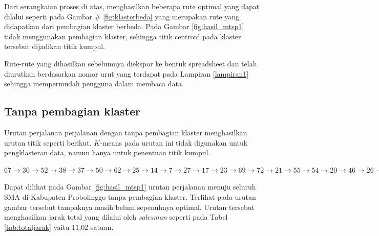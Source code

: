 Dari serangkaian proses di atas, menghasilkan beberapa rute optimal yang dapat dilalui seperti pada Gambar \# \ref{fig:klasterbeda} yang merupakan rute yang didapatkan dari pembagian klaster berbeda. Pada Gambar \ref{fig:hasil_mtsp1} tidak menggunakan pembagian klaster, sehingga titik centroid pada klaster tersebut dijadikan titik kumpul.

Rute-rute yang dihasilkan sebelumnya diekspor ke bentuk spreadsheet dan telah diurutkan berdasarkan nomor urut yang terdapat pada Lampiran \ref{lampiran1} sehingga mempermudah pengguna dalam membaca data.

\subsection{Tanpa pembagian klaster}

Urutan perjalanan perjalanan dengan tanpa pembagian klaster menghasilkan urutan titik seperti berikut. $K$-means pada urutan ini tidak digunakan untuk pengklasteran data, namun hanya untuk penentuan titik kumpul.

\noindent $
67 \rightarrow 30 \rightarrow 52 \rightarrow 38 \rightarrow 37 \rightarrow 50 \rightarrow 62 \rightarrow 25 \rightarrow 14 \rightarrow 7 \rightarrow 27 \rightarrow 17 \rightarrow 23 \rightarrow 69 \rightarrow 72 \rightarrow 21 \rightarrow 55 \rightarrow 54 \rightarrow 20 \rightarrow 46 \rightarrow 26 \rightarrow 59 \rightarrow 60 \rightarrow 16 \rightarrow 58 \rightarrow 45 \rightarrow 15 \rightarrow 65 \rightarrow 36 \rightarrow 18 \rightarrow 40 \rightarrow 70 \rightarrow 75 \rightarrow 2 \rightarrow 44 \rightarrow 11 \rightarrow 41 \rightarrow 53 \rightarrow 3 \rightarrow 71 \rightarrow 10 \rightarrow 6 \rightarrow 29 \rightarrow 74 \rightarrow 68 \rightarrow 47 \rightarrow 32 \rightarrow 56 \rightarrow 63 \rightarrow 9 \rightarrow 51 \rightarrow 49 \rightarrow 35 \rightarrow 1 \rightarrow 73 \rightarrow 24 \rightarrow 33 \rightarrow 57 \rightarrow 61 \rightarrow 22 \rightarrow 34 \rightarrow 8 \rightarrow 43 \rightarrow 66 \rightarrow 42 \rightarrow 13 \rightarrow 5 \rightarrow 4 \rightarrow 64 \rightarrow 31 \rightarrow 39 \rightarrow 19 \rightarrow 28 \rightarrow 48 \rightarrow 12$

Dapat dilihat pada Gambar \ref{fig:hasil_mtsp1} urutan perjalanan menuju seluruh SMA di Kabupaten Probolinggo tanpa pembagian klaster. Terlihat pada urutan gambar tersebut tampaknya masih belum sepenuhnya optimal. Urutan tersebut menghasilkan jarak total yang dilalui oleh \textit{salesman} seperti pada Tabel \ref{tab:totaljarak} yaitu 11,02 satuan.

